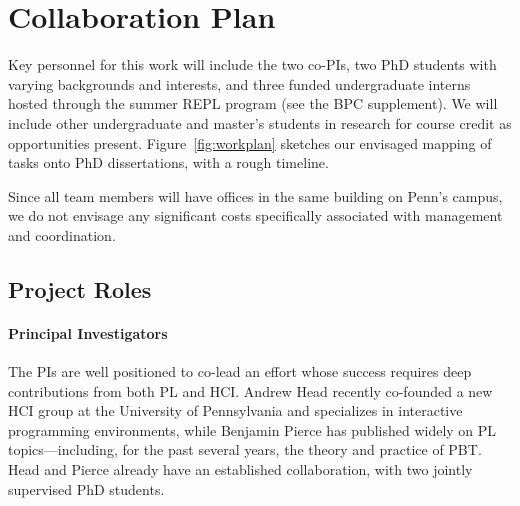 \section*{Collaboration Plan }\label{appendix:coord}


Key personnel for this work will include the two co-PIs, two PhD
students with varying backgrounds and interests,
and three funded undergraduate interns hosted through the summer REPL
program (see the BPC supplement). We will include other undergraduate and
master's students in research for course credit as opportunities
present.
Figure~\ref{fig:workplan} sketches our envisaged mapping of tasks onto
PhD dissertations, with a rough timeline.

Since all team members will have offices in the same building on
Penn's campus, we do not envisage any significant costs specifically
associated with management and coordination.

\subsection*{Project Roles}

\paragraph*{Principal Investigators}
%
The PIs are well positioned to co-lead an effort whose success
requires deep contributions from both PL and HCI.  Andrew Head
recently co-founded a new HCI group at the University of Pennsylvania
and specializes in interactive programming environments, while
Benjamin Pierce has published widely on PL topics---including, for the
past several years, the theory and practice of PBT.  Head and Pierce
already have an established collaboration, with two jointly supervised
PhD students.

